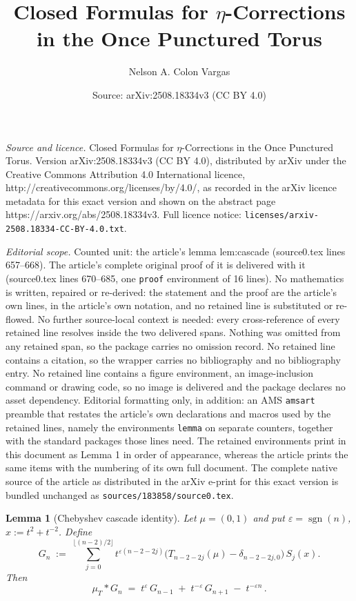 \documentclass[10pt,a4paper]{amsart}
\title{Closed Formulas for $\eta$-Corrections in the Once Punctured Torus}
\author{Nelson A. Colon Vargas}
\date{Source: arXiv:2508.18334v3 (CC BY 4.0)}
\newtheorem{lemma}{Lemma}
\begin{document}
\maketitle

\noindent\emph{Source and licence.} Closed Formulas for $\eta$-Corrections in the Once Punctured Torus. Version arXiv:2508.18334v3 (CC BY 4.0), distributed by arXiv under the Creative Commons Attribution 4.0 International licence, http://creativecommons.org/licenses/by/4.0/, as recorded in the arXiv licence metadata for this exact version and shown on the abstract page https://arxiv.org/abs/2508.18334v3. Full licence notice: \texttt{licenses/arxiv-2508.18334-CC-BY-4.0.txt}.\par\smallskip

\noindent\textit{Editorial scope.} Counted unit: the article's lemma lem:cascade (source0.tex lines 657--668). The article's complete original proof of it is delivered with it (source0.tex lines 670--685, one \texttt{proof} environment of 16 lines). No mathematics is written, repaired or re-derived: the statement and the proof are the article's own lines, in the article's own notation, and no retained line is substituted or re-flowed.  No further source-local context is needed: every cross-reference of every retained line resolves inside the two delivered spans.  Nothing was omitted from any retained span, so the package carries no omission record.  No retained line contains a citation, so the wrapper carries no bibliography and no bibliography entry.  No retained line contains a figure environment, an image-inclusion command or drawing code, so no image is delivered and the package declares no asset dependency.  Editorial formatting only, in addition: an AMS \texttt{amsart} preamble that restates the article's own declarations and macros used by the retained lines, namely the environments \texttt{lemma} on separate counters, together with the standard packages those lines need.  The retained environments print in this document as Lemma 1 in order of appearance, whereas the article prints the same items with the numbering of its own full document.  The complete native source of the article as distributed in the arXiv e-print for this exact version is bundled unchanged as \texttt{sources/183858/source0.tex}.
\begin{lemma}[Chebyshev cascade identity]\label{lem:cascade}
Let $\mu=(0,1)$ and put $\varepsilon=\operatorname{sgn}(n)$, $x:=t^2+t^{-2}$.
Define
\[
G_n \;:=\;\sum_{j=0}^{\lfloor (n-2)/2\rfloor}
t^{\varepsilon(n-2-2j)}\Big(T_{n-2-2j}(\mu)-\delta_{n-2-2j,0}\Big)\,S_j(x).
\]
Then
\begin{equation}\label{eq:cascade}
\mu_T\ast G_n \;=\; t^{\varepsilon}\,G_{n-1} \;+\; t^{-\varepsilon}\,G_{n+1} \;-\; t^{-\varepsilon n}\,.
\end{equation}
\end{lemma}
\end{document}
